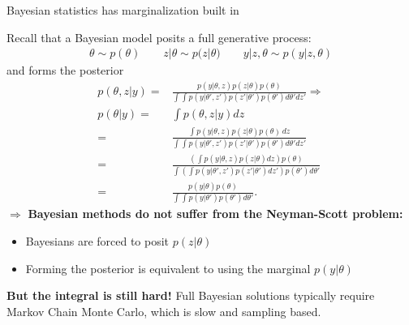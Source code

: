 \begin{frame}{Bayesian statistics has marginalization built in}


Recall that a Bayesian model posits a full generative process:
%
\begin{align*}
%
\theta \sim{} p(\theta) \quad\quad
z | \theta \sim{} p(z | \theta) \quad\quad
y | z, \theta \sim{} p(y | z, \theta)
%
\end{align*}
%
and forms the posterior
%
\begin{align*}
%
p(\theta, z \vert y) ={}& \frac{p(y | \theta, z) p(z | \theta) p(\theta)}
     {\int \int p(y | \theta', z') p(z' | \theta') p(\theta') d\theta' dz'} \Rightarrow\\
 p(\theta \vert y) ={}& \int p(\theta, z \vert y) dz \\
 ={}& \frac{\int p(y | \theta, z) p(z | \theta) p(\theta) \, dz}
      {\int\int p(y | \theta', z') p(z' | \theta') p(\theta') d\theta' dz'} \\
={}& \frac{\left(\int p(y | \theta, z) p(z | \theta)dz \right) p(\theta) }
   {\int\left( \int p(y | \theta', z') p(z' | \theta')dz'\right) p(\theta') d\theta' } \\
={}& \frac{ p(y | \theta) p(\theta) }
  {\int \int p(y | \theta') p(\theta') d\theta'}.
%
\end{align*}
%
$\Rightarrow$
\textbf{Bayesian methods do not suffer from the Neyman-Scott problem:}

\begin{itemize}
    \item Bayesians are forced to posit $p(z | \theta)$
    \item Forming the posterior is equivalent to using the marginal $p(y | \theta)$
\end{itemize}

\textbf{But the integral is still hard!}
%
Full Bayesian solutions typically require Markov Chain Monte Carlo, which is
slow and sampling based.

\end{frame}
